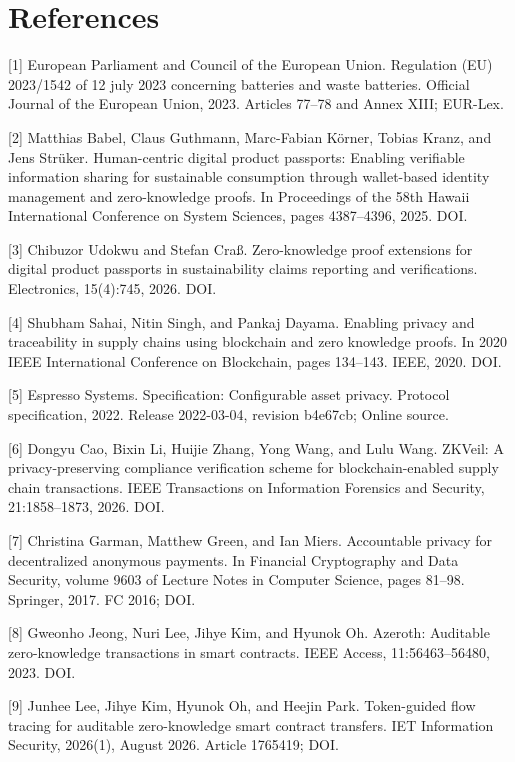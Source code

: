 \section*{References}

[1] European Parliament and Council of the European
Union. Regulation (EU) 2023/1542 of 12 july 2023
concerning batteries and waste batteries. Official
Journal of the European Union, 2023. Articles 77--78
and Annex XIII; EUR-Lex.

    [2] Matthias Babel, Claus Guthmann, Marc-Fabian
Körner, Tobias Kranz, and Jens Strüker.
Human-centric digital product passports: Enabling
verifiable information sharing for sustainable
consumption through wallet-based identity
management and zero-knowledge proofs. In
Proceedings of the 58th Hawaii International
Conference on System Sciences, pages 4387--4396,
2025. DOI.

    [3] Chibuzor Udokwu and Stefan Craß. Zero-knowledge
proof extensions for digital product passports in
sustainability claims reporting and verifications.
Electronics, 15(4):745, 2026. DOI.


    [4] Shubham Sahai, Nitin Singh, and Pankaj Dayama.
Enabling privacy and traceability in supply chains
using blockchain and zero knowledge proofs. In 2020
IEEE International Conference on Blockchain, pages
134--143. IEEE, 2020. DOI.

    [5] Espresso Systems. Specification: Configurable asset
privacy. Protocol specification, 2022. Release
2022-03-04, revision b4e67cb; Online source.

    [6] Dongyu Cao, Bixin Li, Huijie Zhang, Yong Wang, and
Lulu Wang. ZKVeil: A privacy-preserving compliance
verification scheme for blockchain-enabled supply
chain transactions. IEEE Transactions on Information
Forensics and Security, 21:1858--1873, 2026. DOI.

    [7] Christina Garman, Matthew Green, and Ian Miers.
Accountable privacy for decentralized anonymous
payments. In Financial Cryptography and Data
Security, volume 9603 of Lecture Notes in Computer
Science, pages 81--98. Springer, 2017. FC 2016; DOI.

    [8] Gweonho Jeong, Nuri Lee, Jihye Kim, and Hyunok
Oh. Azeroth: Auditable zero-knowledge transactions
in smart contracts. IEEE Access, 11:56463--56480,
2023. DOI.

    [9] Junhee Lee, Jihye Kim, Hyunok Oh, and Heejin Park.
Token-guided flow tracing for auditable
zero-knowledge smart contract transfers. IET
Information Security, 2026(1), August 2026. Article
1765419; DOI.

